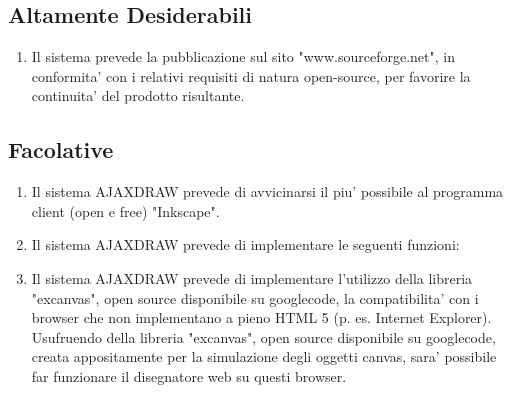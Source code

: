 \subsection{Altamente Desiderabili}
\begin{enumerate}
\item Il sistema prevede la pubblicazione sul sito "www.sourceforge.net", in conformita' con i relativi requisiti di natura open-source, per favorire la continuita' del prodotto risultante.
\end{enumerate}

\subsection{Facolative}
\begin{enumerate}
\item Il sistema AJAXDRAW prevede di avvicinarsi il piu' possibile al programma client (open e free) "Inkscape". 
\item Il sistema AJAXDRAW prevede di implementare le seguenti funzioni:


\item Il sistema  AJAXDRAW prevede di implementare l'utilizzo della libreria "excanvas", open source disponibile su googlecode, la compatibilita' con i browser che non implementano a pieno HTML 5 (p. es. Internet Explorer).
         Usufruendo della libreria "excanvas", open source disponibile su googlecode, creata appositamente per la simulazione degli oggetti canvas, sara' possibile far funzionare il disegnatore web su questi browser. 
\end{enumerate}



